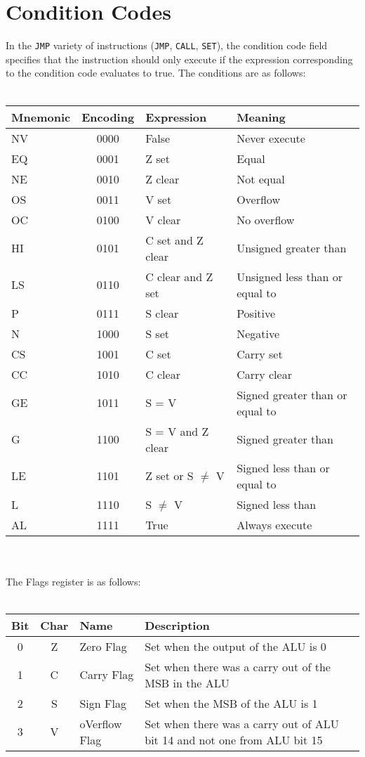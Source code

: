 \documentclass{article}
\begin{document}
        \section{Condition Codes}
        In the \texttt{JMP} variety of instructions (\texttt{JMP}, \texttt{CALL}, \texttt{SET}), the condition code field specifies that the instruction should only execute if the expression corresponding to the condition code evaluates to true. The conditions are as follows: \\ \\
        \begin{tabular}{| l | c | l | l |} \hline
        Mnemonic & Encoding & Expression & Meaning \\ \hline
        NV &0000& False & Never execute\\ \hline
        EQ &0001& Z set & Equal\\ \hline
        NE &0010& Z clear & Not equal \\ \hline
        OS &0011& V set & Overflow \\ \hline
        OC &0100& V clear & No overflow \\ \hline
        HI &0101& C set and Z clear & Unsigned greater than \\ \hline
        LS &0110& C clear and Z set & Unsigned less than or equal to \\ \hline
        P  &0111& S clear & Positive \\ \hline
        N  &1000& S set & Negative \\ \hline
        CS &1001& C set & Carry set \\ \hline
        CC &1010& C clear & Carry clear \\ \hline
        GE &1011& S = V & Signed greater than or equal to\\ \hline
        G  &1100& S = V and Z clear & Signed greater than \\ \hline
        LE &1101& Z set or S $\neq$ V & Signed less than or equal to \\ \hline
        L  &1110& S $\neq$ V & Signed less than \\ \hline
        AL &1111& True & Always execute \\ \hline
        \end{tabular}\\\\
        The Flags register is as follows: \\ \\
        \begin{tabular}{| c | c | l | l |} \hline
          Bit & Char & Name & Description \\ \hline
          0 & Z & Zero Flag & Set when the output of the ALU is 0 \\ \hline
          1 & C & Carry Flag & Set when there was a carry out of the MSB in the ALU \\ \hline
          2 & S & Sign Flag & Set when the MSB of the ALU is 1 \\ \hline
          3 & V & oVerflow Flag & Set when there was a carry out of ALU bit 14 and not one from ALU bit 15 \\ \hline
        \end{tabular}
        
\end{document}
